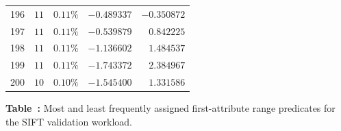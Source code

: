 \begin{center}
\begin{tabular}{rrrrr}
        196 & \(11\)   & \( 0.11\%\) & \(-0.489337\) & \(-0.350872\) \\
        197 & \(11\)   & \( 0.11\%\) & \(-0.539879\) & \( 0.842225\) \\
        198 & \(11\)   & \( 0.11\%\) & \(-1.136602\) & \( 1.484537\) \\
        199 & \(11\)   & \( 0.11\%\) & \(-1.743372\) & \( 2.384967\) \\
        200 & \(10\)   & \( 0.10\%\) & \(-1.545400\) & \( 1.331586\) \\
        \bottomrule
    \end{tabular}
\vspace{0.4em}
\label{tab:sift-range-frequency}
\parbox{0.92\textwidth}{\centering\small
\textbf{Table~\thetable:} Most and least frequently assigned first-attribute range predicates for the \textsc{SIFT} validation workload.}
\end{center}


